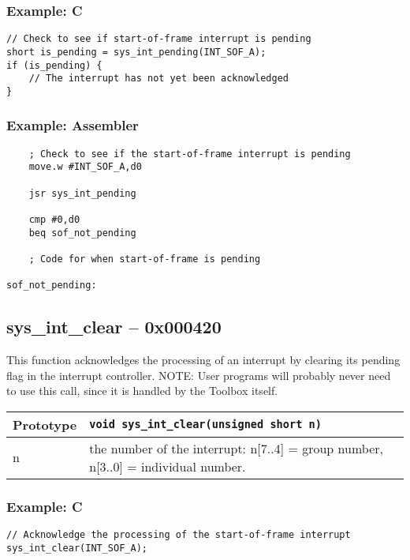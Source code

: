 \subsubsection*{Example: C}
\begin{lstlisting}
// Check to see if start-of-frame interrupt is pending
short is_pending = sys_int_pending(INT_SOF_A);
if (is_pending) {
    // The interrupt has not yet been acknowledged
}
\end{lstlisting}

\subsubsection*{Example: Assembler}
\begin{verbatim}
    ; Check to see if the start-of-frame interrupt is pending
    move.w #INT_SOF_A,d0

    jsr sys_int_pending
    
    cmp #0,d0
    beq sof_not_pending

    ; Code for when start-of-frame is pending

sof_not_pending:
\end{verbatim}

\subsection*{sys\_int\_clear -- 0x000420}
This function acknowledges the processing of an interrupt by clearing its pending flag in the interrupt controller.
NOTE: User programs will probably never need to use this call, since it is handled by the Toolbox itself.

\bigskip

\begin{tabular}{|l||l|} \hline
Prototype & \lstinline!void sys_int_clear(unsigned short n)! \\ \hline
n & the number of the interrupt: n[7..4] = group number, n[3..0] = individual number. \\ \hline
\end{tabular}

\subsubsection*{Example: C}
\begin{lstlisting}
// Acknowledge the processing of the start-of-frame interrupt
sys_int_clear(INT_SOF_A);
\end{lstlisting}

